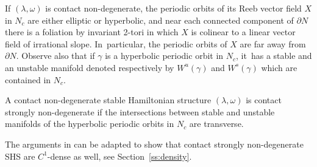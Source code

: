If $(\lambda,\omega)$ is contact non-degenerate, the periodic orbits of its Reeb vector field $X$ in $N_c$ are either elliptic or hyperbolic, and near each connected component of $\partial N$ there is a foliation by invariant 2-tori in which $X$ is colinear to a linear vector field of irrational slope. In~particular, the periodic orbits of $X$ are far away from $\partial N$. Observe also that if $\gamma$ is a hyperbolic periodic orbit in $N_c$, it~has a stable and an unstable manifold denoted respectively by $W^u(\gamma)$ and $W^s(\gamma)$ which are contained in $N_c$.

\begin{defi}
A contact non-degenerate stable Hamiltonian structure $(\lambda,\omega)$ is contact strongly non-degenerate if the intersections between stable and unstable manifolds of the hyperbolic periodic orbits in $N_c$ are transverse.
\end{defi}

The arguments in \cite{CV1} can be adapted to show that contact strongly non-degenerate SHS are $C^1$-dense as well, see Section~\ref{ss:density}.

